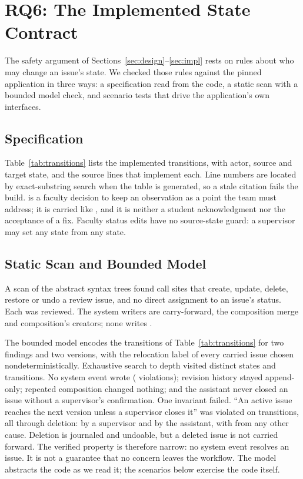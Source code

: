 \section{RQ6: The Implemented State Contract}\label{sec:statecheck}
The safety argument of Sections~\ref{sec:design}--\ref{sec:impl} rests on rules about who may change an issue's state. We checked those rules against the pinned application in three ways: a specification read from the code, a static scan with a bounded model check, and scenario tests that drive the application's own interfaces.

\subsection{Specification}
Table~\ref{tab:transitions} lists the \wpdTransitionRows{} implemented transitions, with actor, source and target state, and the source lines that implement each. Line numbers are located by exact-substring search when the table is generated, so a stale citation fails the build.  is a faculty decision to keep an observation as a point the team must address; it is carried like , and it is neither a student acknowledgment nor the acceptance of a fix. Faculty status edits have no source-state guard: a supervisor may set any state from any state.



\subsection{Static Scan and Bounded Model}
A scan of the abstract syntax trees found \wpdWriters{} call sites that create, update, delete, restore or undo a review issue, and no direct assignment to an issue's status. Each was reviewed. The system writers are carry-forward, the composition merge and composition's creators; none writes .

The bounded model encodes the transitions of Table~\ref{tab:transitions} for two findings and two versions, with the relocation label of every carried issue chosen nondeterministically. Exhaustive search to depth \wpdDepth{} visited \wpdStates{} distinct states and \wpdTransitions{} transitions. No system event wrote  (\wpdSystemResolved{} violations); revision history stayed append-only; repeated composition changed nothing; and the assistant never closed an issue without a supervisor's confirmation. One invariant failed. ``An active issue reaches the next version unless a supervisor closes it'' was violated on \wpdNotCarried{} transitions, all through deletion: \wpdNotCarriedFaculty{} by a supervisor and \wpdNotCarriedAgent{} by the assistant, with \wpdNotCarriedOther{} from any other cause. Deletion is journaled and undoable, but a deleted issue is not carried forward. The verified property is therefore narrow: no system event resolves an issue. It is not a guarantee that no concern leaves the workflow. The model abstracts the code as we read it; the scenarios below exercise the code itself.

